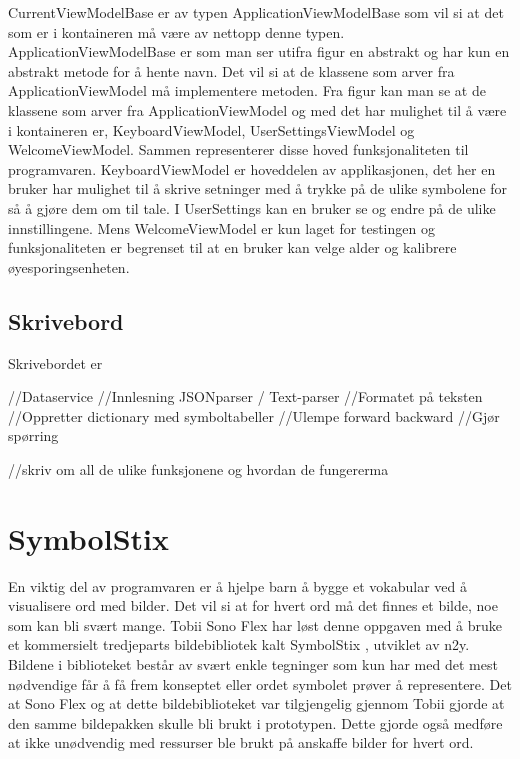 {CurrentViewModelBase er av typen ApplicationViewModelBase som vil si at det som er i kontaineren må være av nettopp denne typen. ApplicationViewModelBase er som man ser utifra figur  en abstrakt og har kun en abstrakt metode for å hente navn.  Det vil si at de klassene som arver fra ApplicationViewModel må implementere metoden. Fra figur kan man se at de klassene som arver fra ApplicationViewModel og med det har mulighet til å være i kontaineren er, KeyboardViewModel, UserSettingsViewModel og WelcomeViewModel. Sammen representerer disse hoved funksjonaliteten til programvaren. KeyboardViewModel er hoveddelen av applikasjonen, det her en bruker har mulighet til å skrive setninger med å trykke på de ulike symbolene for så å gjøre dem om til tale. I UserSettings kan en bruker se og endre på de ulike innstillingene. Mens WelcomeViewModel er kun laget for testingen og funksjonaliteten er begrenset til at en bruker kan velge alder og kalibrere øyesporingsenheten. 
 
 
 
 \subsection{Skrivebord}


Skrivebordet er 


//Dataservice
//Innlesning JSONparser / Text-parser
    //Formatet på teksten
    //Oppretter dictionary med symboltabeller
    //Ulempe forward backward
    //Gjør spørring
    




 
 //skriv om all de ulike funksjonene og hvordan de fungererma
 
 
 
 
 
 
 
 
 
 
 
 
 
 
 
 
 
 
 
 
 
 
 
 
\section{SymbolStix} 
 
 
En viktig del av programvaren er å hjelpe barn å bygge et vokabular ved å visualisere ord med bilder. Det vil si at for hvert ord må det finnes et bilde, noe som kan bli svært mange. Tobii Sono Flex har løst denne oppgaven med å bruke et kommersielt tredjeparts bildebibliotek kalt SymbolStix \cite{n2y}, utviklet av n2y. Bildene i biblioteket består av svært enkle tegninger som kun har med det mest nødvendige får å få frem konseptet eller ordet symbolet prøver å representere. Det at Sono Flex og at dette bildebiblioteket var tilgjengelig gjennom Tobii gjorde at den samme bildepakken skulle bli brukt i prototypen. Dette gjorde også medføre at ikke unødvendig med ressurser ble brukt på anskaffe bilder for hvert ord. 
 
}
